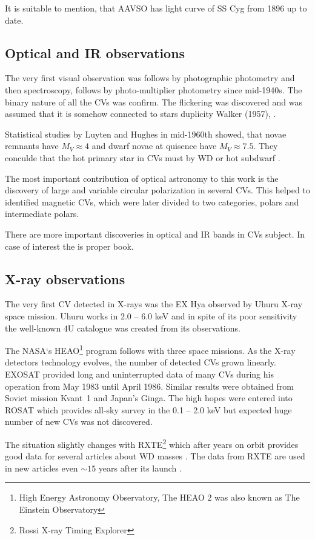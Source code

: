 \documentclass[oneside,a4paper,11pt]{report}
\begin{document}
It is suitable to mention, that AAVSO has light curve of SS Cyg from 1896 up to date. 
\subsection{Optical and IR observations}
The very first visual observation was follows by photographic photometry and then spectroscopy, 
follows by photo-multiplier photometry since mid-1940s. The binary nature of all the CVs was confirm. 
The flickering was discovered and was assumed that it is somehow connected to stars duplicity Walker (1957),
\citet{warner:1}.

Statistical studies by Luyten and Hughes in mid-1960th showed, that novae remnants have $M_V \approx 4$ and 
dwarf novae at quisence have $M_V \approx 7.5$. They conculde that the hot primary star in CVs must by WD or 
 hot subdwarf \citet{warner:1}.   

The most important contribution of optical astronomy to this work is the discovery of large and 
variable circular polarization in several CVs. This helped to identified magnetic CVs, 
which were later divided to two categories, polars and intermediate polars.

There are more important discoveries in optical and IR bands in CVs subject. In case of interest the 
 \citet{warner:1} is proper book. 
   
   
\subsection{X-ray observations}
The very first CV detected in X-rays was the EX Hya observed by Uhuru X-ray space mission. 
Uhuru  works in 2.0 – 6.0 keV and in spite of its poor sensitivity the well-known 4U catalogue
 was created \citet{1978ApJS...38..357F} from its observations.

The NASA`s HEAO\footnote{High Energy Astronomy Observatory, The HEAO 2 was also known as 
The Einstein Observatory} program follows with three space missions. As the X-ray detectors 
technology evolves, the number of detected CVs grown linearly. \mbox{EXOSAT} provided long and 
uninterrupted data of many CVs during his operation from May 1983 until April 1986. 
Similar results were obtained from Soviet mission \mbox{Kvant 1} and Japan's Ginga.
The high hopes were entered into ROSAT which provides all-sky survey in the
 0.1 – 2.0 keV but expected huge number of new CVs was not discovered. 

The situation slightly changes with RXTE\footnote{Rossi X-ray Timing Explorer} which after 
years on orbit provides good data for several articles about WD masses \citet{2005A&A...435..191S}. 
The data from RXTE are used in new articles even $\sim15$ years after its launch \citet{2011A&A...526A..77B}.
 
\end{document}
